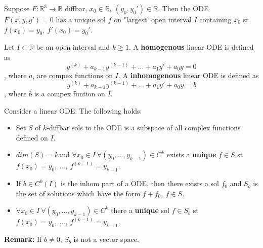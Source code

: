 \begin{theorem}
	Suppose $F: \mathbb{R}^3 \rightarrow \mathbb{R}$ diffbar, $x_0 \in \mathbb{R}, \  (y_0,y_0') \in \mathbb{R}$.
	Then the ODE $F(x,y,y') = 0$ has a unique sol $f$ on "largest' open interval $I$ containing $x_0$ st $f(x_0)= y_0, \ f'(x_0)=y_0'$.
\end{theorem}

\begin{definition}
	Let $I \subset \mathbb{R}$ be an open interval and $k \geq 1$. 
	A \textbf{homogenous} linear ODE is defined as
	$$ y^{(k)} + a_{k-1}y^{(k-1)} + ... + a_1y' + a_0y = 0 $$
	, where $a_i$ are compex functions on $I$.
	A \textbf{inhomogenous} linear ODE is defined as
	$$ y^{(k)} + a_{k-1}y^{(k-1)} + ... + a_1y' + a_0y = b$$
	, where $b$ is a compex funtion on $I$.
\end{definition}

\begin{theorem}
	Consider a linear ODE. The following holds:
	\begin{itemize}
		\item Set $S$ of $k$-diffbar sols to the ODE is a subspace of all complex functions defined on $I$.
		\item $dim(S)=k$and $\forall x_0 \in I \ \forall (y_0,...,y_{k-1}) \in C^k$ exists a \textbf{unique} $f\in S$ st $f(x_0) = y_0, \ ..., \ f^{(k-1)} = y_{k-1}$.
		\item If $b \in C^0(I)$ is the inhom part of a ODE, then there exists a sol $f_0$ and $S_b$ is the set of solutions which have the form $f + f_0, \ f \in S$.
		\item $\forall x_0 \in I \ \forall (y_0,...,y_{k-1}) \in C^k$ there a \textbf{unique} sol $f \in S_b$ st $f(x_0) = y_0, \ ..., \ f^{(k-1)} = y_{k-1}$.
	\end{itemize}
	\textbf{Remark:} If $b \neq 0$, $S_b$ is not a vector space. 
\end{theorem}
